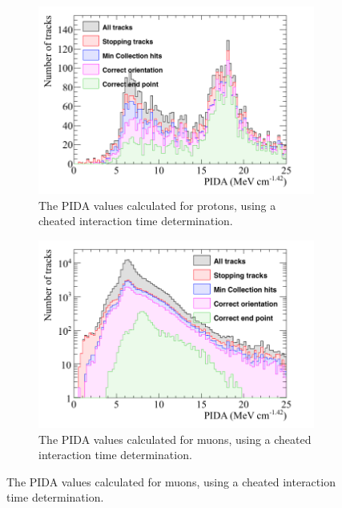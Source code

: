 \begin{figure}
\begin{subfigure}{0.48\textwidth}
        \label{fig:CRY_PIDACuts_Muon_NonCheat}
  \end{subfigure}
  \begin{subfigure}{0.48\textwidth}
        \centering
        \includegraphics[width=\textwidth]{ProtonEnrich_500V_v05_14_00_trackpmtrackdc_MinTrCut_Proton_PIDA}
        \caption{The PIDA values calculated for protons, using a cheated interaction time determination.}
        \label{fig:CRY_PIDACuts_Proton_Cheat}
  \end{subfigure}%
  \hspace{0.03\textwidth}%
  \begin{subfigure}{0.48\textwidth}
        \centering
        \includegraphics[width=\textwidth]{ProtonEnrich_500V_v05_14_00_trackpmtrackdc_MinTrCut_Muon_PIDA}
        \caption{The PIDA values calculated for muons, using a cheated interaction time determination.}

\end{subfigure}
\end{figure}
